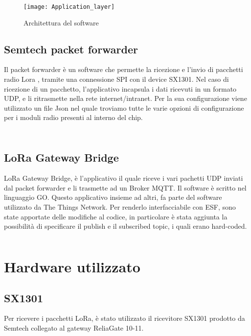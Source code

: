 \begin{figure}[h]
        \centering 
                \texttt{[image: Application\_layer]}
        \caption{Architettura del software}
        \label{fig:Software_stack}
\end{figure}

\subsection{Semtech packet forwarder}
Il packet forwarder è un software che permette la ricezione e l'invio di pacchetti radio Lora ,
tramite una connessione SPI con il device SX1301. Nel caso di ricezione di un
pacchetto, l'applicativo incapsula i dati ricevuti in un formato UDP, e li
ritrasmette nella rete internet/intranet. Per la sua configurazione viene
utilizzato un file Json nel quale troviamo tutte le varie opzioni di
configurazione per i moduli radio presenti al interno del chip.
\inputminted[mathescape, gobble=2, frame=lines, linenos=true
framesep=2mm, firstline=1,lastline=23]{json}{Code_Files/global_json.conf}
\inputminted[mathescape, gobble=2, frame=lines, linenos=true
framesep=2mm, firstline=173,lastline=184]{json}{Code_Files/global_json.conf}

\subsection{LoRa Gateway Bridge}
LoRa Gateway Bridge, è l'applicativo il quale riceve i vari pachetti UDP inviati
dal packet forwarder e li trasmette ad un Broker MQTT. Il software è scritto nel
linguaggio GO. Questo applicativo insieme ad altri, fa parte del software utilizzato da The Things
Network. Per renderlo interfacciabile con ESF, sono state apportate delle 
modifiche al codice, in particolare è stata aggiunta la possibilità di
specificare il publish e il subscribed topic, i quali erano hard-coded.
\inputminted[mathescape, gobble=2, frame=lines, linenos=true
framesep=2mm, firstline=1,lastline=23]{json}{Code_Files/message.json}
\section{Hardware utilizzato}

\subsection{SX1301}
Per ricevere i pacchetti LoRa, è stato utilizzato il ricevitore SX1301 prodotto
da Semtech collegato al gateway ReliaGate 10-11.
